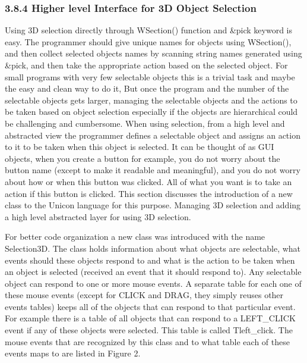 \documentclass[letterpaper]{article}
\begin{document}
{\subsubsection[3.8.4 Higher level Interface for 3D Object Selection]{3.8.4 Higher level Interface for 3D Object Selection}

Using 3D selection directly through \textsf{WSection()} function and
\textsf{\&}\textsf{pick} keyword is easy. The programmer should give
unique names for objects using \textsf{WSection}\textsf{()}, and then
collect selected objects names by scanning string names generated
using \textsf{\&pick}, and then take the appropriate action based on
the selected object. For small programs with very few selectable
objects this is a trivial task and maybe the easy and clean way to do
it, But once the program and the number of the selectable objects gets
larger, managing the selectable objects and the actions to be taken
based on object selection especially if the objects are hierarchical
could be challenging and cumbersome. When using selection, from a high
level and abstracted view the programmer defines a selectable object
and assigns an action to it to be taken when this object is
selected. It can be thought of as GUI objects, when you create a
button for example, you do not worry about the button name (except to
make it readable and meaningful), and you do not worry about how or
when this button was clicked. All of what you want is to take an
action if this button is clicked. This section discusses the
introduction of a new class to the Unicon language for this
purpose. Managing 3D selection and adding a high level abstracted
layer for using 3D selection.

For better code organization a new class was introduced with the name
Selection3D. The class holds information about what objects are
selectable, what events should these objects respond to and what is
the action to be taken when an object is selected (received an event
that it should respond to). Any selectable object can respond to one
or more mouse events. A separate table for each one of these mouse
events (except for \textsf{CLICK} and \textsf{DRAG}, they simply
reuses other events tables) keeps all of the objects that can respond
to that particular event. For example there is a table of all objects
that can respond to a \textsf{LEFT}\textsf{\_}\textsf{CLICK} event if
any of these objects were selected. This table is called
\textsf{Tleft}\textsf{\_}\textsf{click}. The mouse events that are
recognized by this class and to what table each of these events maps
to are listed in Figure 2.

}
\end{document}
